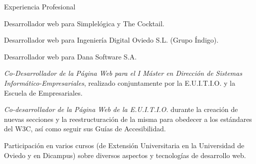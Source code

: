 
\begin{rubric}{Experiencia Profesional}


  \entry*[Desde el 02/2010]
  Desarrollador web para Simplelógica y The Cocktail.

  \entry*[Del 04/2008 al 02/2010]
  Desarrollador web para Ingeniería Digital Oviedo S.L. (Grupo Índigo).

  \entry*[Del 10/2006 al 06/2007]
  Desarrollador web para Dana Software S.A.

  \entry*[Del 06/2006  al 07/2006]
  \emph{Co-Desarrollador de la Página Web para el I Máster en Dirección de Sistemas Informático-Empresariales}, realizado conjuntamente por la E.U.I.T.I.O. y la Escuela de Empresariales.

  \entry*[Del 02/2005 \\al 06/2006]
  \emph{Co-desarrollador de la Página Web de la E.U.I.T.I.O.} durante la creación de nuevas secciones y la reestructuración de la misma para obedecer a los estándares del W3C, así como seguir sus Guías de Accesibilidad.


  \entry*[2008-2010]
  Participación en varios cursos (de Extensión Universitaria en la Universidad de Oviedo y en Dicampus) sobre diversos aspectos y tecnologías de desarrollo web.


\end{rubric}

